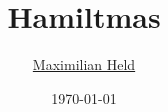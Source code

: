 \documentclass[11pt,a4paper,oneside,english]{article}
\title{
	Hamiltmas
	}
\author{
	\href{http://www.maxheld.de}{Maximilian Held}
}
\date{
	\today
}
\begin{document}
\begin{abstract}
\end{abstract}

\maketitle









\end{document}
